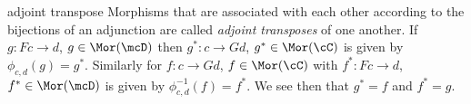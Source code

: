 \begin{frame}
\begin{block}{adjoint transpose}
Morphisms that are associated with each other according to the bijections of an adjunction are called {\it adjoint transposes} of one another. If $g:Fc \rightarrow d$, $g \in \Mor(\mcD)$ then $g^*: c \rightarrow Gd$, $g^* \in \Mor(\cC)$ is given by $\phi_{c,d}(g) = g^*$. Similarly for $f: c \rightarrow Gd$, $f \in \Mor(\cC)$ with $f^*:Fc \rightarrow d$, $f^* \in \Mor(\mcD)$ is given by $\phi_{c,d}^{-1}(f) = f^*$. We see then that $g^* = f$ and $f^* = g$.
\end{block}
\end{frame}
